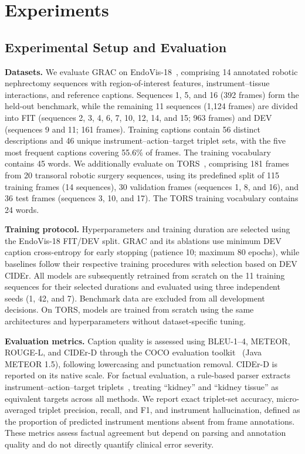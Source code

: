 \documentclass[11pt]{article}
\begin{document}
\section{Experiments}\label{sec4}

\subsection{Experimental Setup and Evaluation}\label{subsec4.1}

\textbf{Datasets.}
We evaluate GRAC on EndoVis-18~\cite{b2,b3,b8}, comprising 14 annotated robotic nephrectomy sequences with region-of-interest features, instrument--tissue interactions, and reference captions. Sequences 1, 5, and 16 (392 frames) form the held-out benchmark, while the remaining 11 sequences (1,124 frames) are divided into FIT (sequences 2, 3, 4, 6, 7, 10, 12, 14, and 15; 963 frames) and DEV (sequences 9 and 11; 161 frames). Training captions contain 56 distinct descriptions and 46 unique instrument--action--target triplet sets, with the five most frequent captions covering 55.6\% of frames. The training vocabulary contains 45 words. We additionally evaluate on TORS~\cite{b3,b4}, comprising 181 frames from 20 transoral robotic surgery sequences, using its predefined split of 115 training frames (14 sequences), 30 validation frames (sequences 1, 8, and 16), and 36 test frames (sequences 3, 10, and 17). The TORS training vocabulary contains 24 words.

\textbf{Training protocol.}
Hyperparameters and training duration are selected using the EndoVis-18 FIT/DEV split. GRAC and its ablations use minimum DEV caption cross-entropy for early stopping (patience 10; maximum 80 epochs), while baselines follow their respective training procedures with selection based on DEV CIDEr. All models are subsequently retrained from scratch on the 11 training sequences for their selected durations and evaluated using three independent seeds (1, 42, and 7). Benchmark data are excluded from all development decisions. On TORS, models are trained from scratch using the same architectures and hyperparameters without dataset-specific tuning.

\textbf{Evaluation metrics.}
Caption quality is assessed using BLEU-1--4, METEOR, ROUGE-L, and CIDEr-D through the COCO evaluation toolkit~\cite{b24,b25} (Java METEOR 1.5), following lowercasing and punctuation removal. CIDEr-D is reported on its native scale. For factual evaluation, a rule-based parser extracts instrument--action--target triplets~\cite{b26}, treating ``kidney'' and ``kidney tissue'' as equivalent targets across all methods. We report exact triplet-set accuracy, micro-averaged triplet precision, recall, and F1, and instrument hallucination, defined as the proportion of predicted instrument mentions absent from frame annotations. These metrics assess factual agreement but depend on parsing and annotation quality and do not directly quantify clinical error severity.
\end{document}
